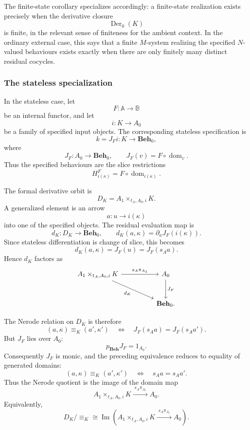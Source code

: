 The finite-state corollary specializes accordingly: a finite-state realization exists precisely when the derivative closure
\[
    \operatorname{Der}_0(K)
\]
is finite, in the relevant sense of finiteness for the ambient context. In the ordinary external case, this says that a finite \(M\)-system realizing the specified \(N\)-valued behaviours exists exactly when there are only finitely many distinct residual cocycles.

\subsubsection{The stateless specialization}

In the stateless case, let
\[
    F:\mathbb A\to\mathbb B
\]
be an internal functor, and let
\[
    i:K\to A_0
\]
be a family of specified input objects. The corresponding stateless specification is
\[
    k
        =
    J_F i:
    K\to\mathbf{Beh}_0,
\]
where
\[
    J_F:A_0\to\mathbf{Beh}_0,
    \qquad
    J_F(v)=F\circ\operatorname{dom}_v.
\]
Thus the specified behaviours are the slice restrictions
\[
    H^F_{i(\kappa)}
        =
    F\circ\operatorname{dom}_{i(\kappa)}.
\]

The formal derivative orbit is
\[
    D_K
        =
    A_1\times_{t_A,A_0,i}K.
\]
A generalized element is an arrow
\[
    a:u\to i(\kappa)
\]
into one of the specified objects. The residual evaluation map is
\[
    d_K:D_K\to\mathbf{Beh}_0,
    \qquad
    d_K(a,\kappa)=\partial_aJ_F(i(\kappa)).
\]
Since stateless differentiation is change of slice, this becomes
\[
    d_K(a,\kappa)=J_F(u)=J_F(s_Aa).
\]
Hence \(d_K\) factors as
\[
    \begin{tikzcd}[column sep=huge, row sep=large]
            A_1\times_{t_A,A_0,i}K
                \arrow[r, "s_A\pi_{A_1}"]
                \arrow[dr, "d_K"']
        &
            A_0
                \arrow[d, "J_F"]
        \\
        &
            \mathbf{Beh}_0 .
    \end{tikzcd}
\]

The Nerode relation on \(D_K\) is therefore
\[
    (a,\kappa)\equiv_K(a',\kappa')
    \quad\Longleftrightarrow\quad
    J_F(s_Aa)=J_F(s_Aa').
\]
But \(J_F\) lies over \(A_0\):
\[
    p_{\mathbf{Beh}}J_F=1_{A_0}.
\]
Consequently \(J_F\) is monic, and the preceding equivalence reduces to equality of generated domains:
\[
    (a,\kappa)\equiv_K(a',\kappa')
    \quad\Longleftrightarrow\quad
    s_Aa=s_Aa'.
\]
Thus the Nerode quotient is the image of the domain map
\[
    A_1\times_{t_A,A_0,i}K
        \xrightarrow{\;s_A\pi_{A_1}\;}
    A_0.
\]
Equivalently,
\[
    D_K/{\equiv_K}
        \cong
    \operatorname{Im}
    \left(
        A_1\times_{t_A,A_0,i}K
            \xrightarrow{\;s_A\pi_{A_1}\;}
        A_0
    \right).
\]

